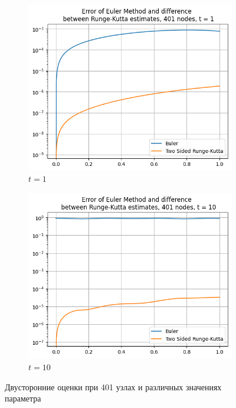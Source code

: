 \begin{figure}[H]
	\centering
	\begin{subfigure}{0.45\textwidth}
		\centering
		\includegraphics[width=\linewidth]{img/errorEulerAndDifferenceBtwEstimates/ErrEuDifRK31}
		\caption{$t = 1$}
	\end{subfigure}
	\hfill
	\begin{subfigure}{0.45\textwidth}
		\centering
		\includegraphics[width=\linewidth]{img/errorEulerAndDifferenceBtwEstimates/ErrEuDifRK32}
		\caption{$t = 10$}
	\end{subfigure}
	\caption{Двусторонние оценки при 401 узлах и различных значениях параметра}
	\label{fig:two_graphs}
\end{figure}



